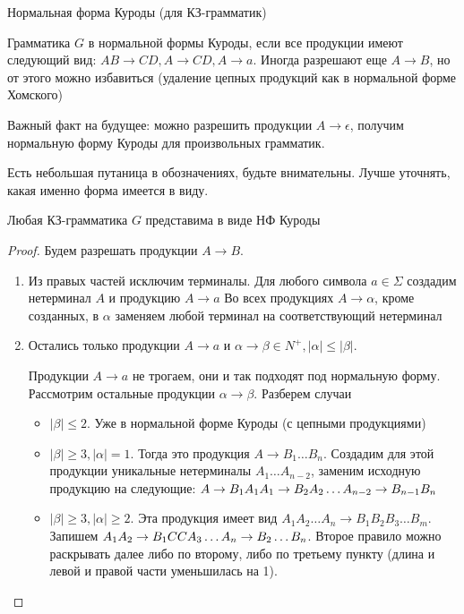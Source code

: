 \begin{Def}
Нормальная форма Куроды (для КЗ-грамматик)

Грамматика $G$ в нормальной формы Куроды, если все продукции имеют следующий вид: $AB \to CD, A \to CD, A \to a$. 
Иногда разрешают еще $A \to B$, но от этого можно избавиться (удаление цепных продукций как в нормальной форме Хомского)
\end{Def}
\begin{Rem}
Важный факт на будущее: можно разрешить продукции $A \to \epsilon$, получим нормальную форму Куроды для произвольных грамматик.
\end{Rem}
\begin{Rem}
Есть небольшая путаница в обозначениях, будьте внимательны. Лучше уточнять, какая именно форма имеется в виду.
\end{Rem}
\begin{theorem}
Любая КЗ-грамматика $G$ представима в виде НФ Куроды
\end{theorem}
\begin{proof}
Будем разрешать продукции $A \to B$.
\begin{enumerate}
\item
Из правых частей исключим терминалы.
Для любого символа $a \in \Sigma$ создадим нетерминал $A$ и продукцию $A \to a$
Во всех продукциях $A \to \alpha$, кроме созданных, в $\alpha$ заменяем любой терминал на соответствующий нетерминал

\item
Остались только продукции $A \to a$ и $\alpha \to \beta \in N^{+}, |\alpha| \leq |\beta|$. 

Продукции $A \to a$ не трогаем, они и так подходят под нормальную форму.
Рассмотрим остальные продукции $\alpha \to \beta$. Разберем случаи
\begin{itemize}
\item
$|\beta| \leq 2$. Уже в нормальной форме Куроды (с цепными продукциями)
\item
$|\beta| \geq 3, |\alpha| = 1$. Тогда это продукция $A \to B_1 \dots B_n$.
Создадим для этой продукции уникальные нетерминалы $A_1 \dots A_{n - 2}$, заменим исходную продукцию на следующие: $\\
A \to B_1 A_1 \\
A_1 \to B_2 A_2 \\ 
\dots \\
A_{n - 2} \to B_{n - 1} B_n
$
\item
$|\beta| \geq 3, |\alpha| \geq 2$. Эта продукция имеет вид $A_1A_2 \dots A_n \to B_1B_2B_3 \dots B_m$.
Запишем $\\
A_1 A_2 \to B_1 C \\
C A_3 \dots A_n \to B_2 \dots B_n$.
Второе правило можно раскрывать далее либо по второму, либо по третьему пункту (длина и левой и правой части уменьшилась на 1).
\end{itemize}
\end{enumerate}
\end{proof}

